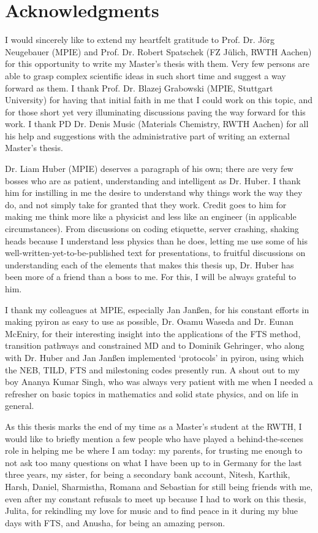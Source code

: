 \documentclass{article}
\begin{document}
\clearpage
\section{Acknowledgments}

I would sincerely like to extend my heartfelt gratitude to Prof. Dr. Jörg Neugebauer (MPIE) and Prof. Dr. Robert Spatschek (FZ Jülich, RWTH Aachen) for this opportunity to write my Master's thesis with them. Very few persons are able to grasp complex scientific ideas in such short time and suggest a way forward as them. I thank Prof. Dr. Blazej Grabowski (MPIE, Stuttgart University) for having that initial faith in me that I could work on this topic, and for those short yet very illuminating discussions paving the way forward for this work. I thank PD Dr. Denis Music (Materials Chemistry, RWTH Aachen) for all his help and suggestions with the administrative part of writing an external Master's thesis.

Dr. Liam Huber (MPIE) deserves a paragraph of his own; there are very few bosses who are as patient, understanding and intelligent as Dr. Huber. I thank him for instilling in me the desire to understand why things work the way they do, and not simply take for granted that they work. Credit goes to him for making me think more like a physicist and less like an engineer (in applicable circumstances). From discussions on coding etiquette, server crashing, shaking heads because I understand less physics than he does, letting me use some of his well-written-yet-to-be-published text for presentations, to fruitful discussions on understanding each of the elements that makes this thesis up, Dr. Huber has been more of a friend than a boss to me. For this, I will be always grateful to him.

I thank my colleagues at MPIE, especially Jan Janßen, for his constant efforts in making pyiron as easy to use as possible, Dr. Osamu Waseda and Dr. Eunan McEniry, for their interesting insight into the applications of the FTS method, transition pathways and constrained MD and to Dominik Gehringer, who along with Dr. Huber and Jan Janßen implemented \enquote*{protocols} in pyiron, using which the NEB, TILD, FTS and milestoning codes presently run. A shout out to my boy Ananya Kumar Singh, who was always very patient with me when I needed a refresher on basic topics in mathematics and solid state physics, and on life in general. 

As this thesis marks the end of my time as a Master's student at the RWTH, I would like to briefly mention a few people who have played a behind-the-scenes role in helping me be where I am today: my parents, for trusting me enough to not ask too many questions on what I have been up to in Germany for the last three years, my sister, for being a secondary bank account, Nitesh, Karthik, Harsh, Daniel, Sharmistha, Romana and Sebastian for still being friends with me, even after my constant refusals to meet up because I had to work on this thesis, Julita, for rekindling my love for music and to find peace in it during my blue days with FTS, and Anusha, for being an amazing person.
\end{document}
